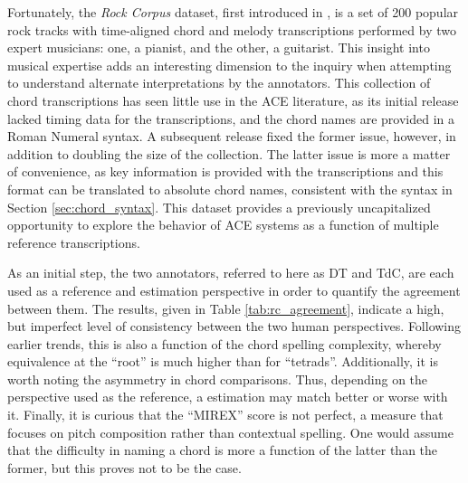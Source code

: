 Fortunately, the \emph{Rock Corpus} dataset, first introduced in \cite{deClercq2011Corpus}, is a set of 200 popular rock tracks with time-aligned chord and melody transcriptions performed by two expert musicians:
one, a pianist, and the other, a guitarist.
This insight into musical expertise adds an interesting dimension to the inquiry when attempting to understand alternate interpretations by the annotators.
This collection of chord transcriptions has seen little use in the ACE literature, as its initial release lacked timing data for the transcriptions, and the chord names are provided in a Roman Numeral syntax.
A subsequent release fixed the former issue, however, in addition to doubling the size of the collection.
The latter issue is more a matter of convenience, as key information is provided with the transcriptions and this format can be translated to absolute chord names, consistent with the syntax in Section \ref{sec:chord_syntax}.
This dataset provides a previously uncapitalized opportunity to explore the behavior of ACE systems as a function of multiple reference transcriptions.




%

As an initial step, the two annotators, referred to here as DT and TdC, are each used as a reference and estimation perspective in order to quantify the agreement between them.
The results, given in Table \ref{tab:rc_agreement}, indicate a high, but imperfect level of consistency between the two human perspectives.
Following earlier trends, this is also a function of the chord spelling complexity, whereby equivalence at the ``root'' is much higher than for ``tetrads''.
Additionally, it is worth noting the asymmetry in chord comparisons.
Thus, depending on the perspective used as the reference, a estimation may match better or worse with it.
Finally, it is curious that the ``MIREX'' score is not perfect, a measure that focuses on pitch composition rather than contextual spelling.
One would assume that the difficulty in naming a chord is more a function of the latter than the former, but this proves not to be the case.

